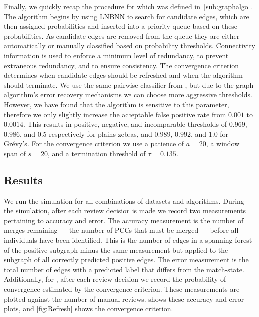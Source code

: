     Finally, we quickly recap the procedure for  which was defined in~\cref{sub:graphalgo}.
    The algorithm begins by using LNBNN to search for candidate edges, which are then assigned probabilities and
      inserted into a priority queue based on these probabilities.
    As candidate edges are removed from the queue they are either automatically or manually classified based on
      probability thresholds.
    Connectivity information is used to enforce a minimum level of redundancy, to prevent extraneous redundancy,
      and to ensure consistency.
    The convergence criterion determines when candidate edges should be refreshed and when the algorithm should
      terminate.
    We use the same pairwise classifier from , but due to the graph algorithm's error recovery
      mechanisms we can choose more aggressive thresholds.
    However, we have found that the algorithm is sensitive to this parameter, therefore we only slightly increase
      the acceptable false positive rate from $0.001$ to $0.0014$.
    This results in positive, negative, and incomparable thresholds of $0.969$, $0.986$, and $0.5$ respectively
      for plains zebras, and $0.989$, $0.992$, and $1.0$ for Grévy's.
    For the convergence criterion we use a patience of $a=20$, a window span of $s=20$, and a termination
      threshold of $\tau=0.135$.

    \subsection{Results}

    We run the simulation for all combinations of datasets and algorithms.
    During the simulation, after each review decision is made we record two measurements pertaining to accuracy
      and error.
    The accuracy measurement is the number of merges remaining --- \ie{} the number of PCCs that must be merged
      --- before all individuals have been identified.
    This is the number of edges in a spanning forest of the \groundtruth{} positive subgraph minus the same
      measurement but applied to the subgraph of all correctly predicted positive edges.
    The error measurement is the total number of edges with a predicted label that differs from the
      \groundtruth{} match-state.
    Additionally, for , after each review decision we record the probability of convergence estimated
      by the convergence criterion.
    These measurements are plotted against the number of manual reviews.
     shows these accuracy and error plots, and \cref{fig:Refresh} shows the convergence
      criterion.

